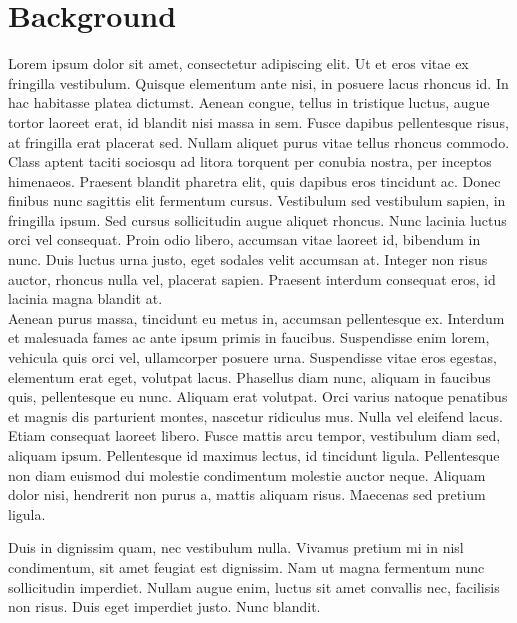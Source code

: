 \section{Background}

Lorem ipsum dolor sit amet, consectetur adipiscing elit. Ut et eros vitae ex fringilla vestibulum. Quisque elementum ante nisi, in posuere lacus rhoncus id. In hac habitasse platea dictumst. Aenean congue, tellus in tristique luctus, augue tortor laoreet erat, id blandit nisi massa in sem. Fusce dapibus pellentesque risus, at fringilla erat placerat sed. Nullam aliquet purus vitae tellus rhoncus commodo. Class aptent taciti sociosqu ad litora torquent per conubia nostra, per inceptos himenaeos. Praesent blandit pharetra elit, quis dapibus eros tincidunt ac. Donec finibus nunc sagittis elit fermentum cursus. Vestibulum sed vestibulum sapien, in fringilla ipsum. Sed cursus sollicitudin augue aliquet rhoncus. Nunc lacinia luctus orci vel consequat. Proin odio libero, accumsan vitae laoreet id, bibendum in nunc. Duis luctus urna justo, eget sodales velit accumsan at. Integer non risus auctor, rhoncus nulla vel, placerat sapien. Praesent interdum consequat eros, id lacinia magna blandit at. \\

Aenean purus massa, tincidunt eu metus in, accumsan pellentesque ex. Interdum et malesuada fames ac ante ipsum primis in faucibus. Suspendisse enim lorem, vehicula quis orci vel, ullamcorper posuere urna. Suspendisse vitae eros egestas, elementum erat eget, volutpat lacus. Phasellus diam nunc, aliquam in faucibus quis, pellentesque eu nunc. Aliquam erat volutpat. Orci varius natoque penatibus et magnis dis parturient montes, nascetur ridiculus mus. Nulla vel eleifend lacus. Etiam consequat laoreet libero. Fusce mattis arcu tempor, vestibulum diam sed, aliquam ipsum. Pellentesque id maximus lectus, id tincidunt ligula. Pellentesque non diam euismod dui molestie condimentum molestie auctor neque. Aliquam dolor nisi, hendrerit non purus a, mattis aliquam risus. Maecenas sed pretium ligula.

Duis in dignissim quam, nec vestibulum nulla. Vivamus pretium mi in nisl condimentum, sit amet feugiat est dignissim. Nam ut magna fermentum nunc sollicitudin imperdiet. Nullam augue enim, luctus sit amet convallis nec, facilisis non risus. Duis eget imperdiet justo. Nunc blandit.